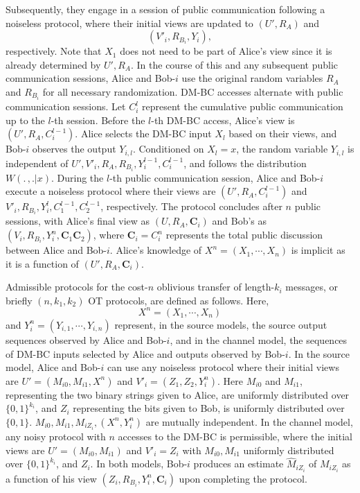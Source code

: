 \documentclass[runningheads]{llncs}
\newcommand{\parbreak}{ \vspace{0.3 em}}
\newcounter{protocol}
\begin{document}
\parbreak Subsequently, they engage in a session of public communication following a noiseless protocol, where their initial views are updated to $(U', R_{A})$ and \[(V'_i, R_{B_i}, Y_i),\] respectively. Note that $X_{1}$ does not need to be part of Alice's view since it is already determined by $U', R_{A}$. In the course of this and any subsequent public communication sessions, Alice and Bob-$i$ use the original random variables $R_{A}$ and $R_{B_i}$ for all necessary randomization. DM-BC accesses alternate with public communication sessions. Let $C_i^l$ represent the cumulative public communication up to the $l$-th session. Before the $l$-th DM-BC access, Alice's view is $(U', R_{A}, C_i^{l-1})$. Alice selects the DM-BC input $X_{l}$ based on their views, and Bob-$i$ observes the output $Y_{i,l}$. Conditioned on $X_{l} = x$, the random variable $Y_{i,l}$ is independent of $U', V'_i, R_{A}, R_{B_i}, Y_i^{l-1}, C_i^{l-1}$, and follows the distribution $W(.\,,.|x)$. During the $l$-th public communication session, Alice and Bob-$i$ execute a noiseless protocol where their views are $(U', R_{A}, C_i^{l-1})$ and $V'_i, R_{B_i}, Y_i^l, C_1^{l-1},C_2^{l-1}$, respectively. The protocol concludes after $n$ public sessions, with Alice's final view as $(U, R_{A},\mathbf{C}_i)$ and Bob's as $(V_i, R_{B_i}, Y_i^n, \mathbf{C}_1 \mathbf{C}_2)$, where $\mathbf{C}_i = C_i^n$ represents the total public discussion between Alice and Bob-$i$. Alice's knowledge of $X^n = (X_{1}, \cdots, X_{n})$ is implicit as it is a function of $(U', R_{A}, \mathbf{C}_i)$. 

\parbreak Admissible protocols for the cost-$n$ oblivious transfer of length-$k_i$ messages, or briefly $(n,k_1,k_2)$ OT protocols, are defined as follows. Here, \[X^n = (X_{1}, \cdots, X_{n})\] and $Y_i^n = (Y_{i,1}, \cdots, Y_{i,n})$ represent, in the source models, the source output sequences observed by Alice and Bob-$i$, and in the channel model, the sequences of DM-BC inputs selected by Alice and outputs observed by Bob-$i$. In the source model, Alice and Bob-$i$ can use any noiseless protocol where their initial views are $U' = (M_{i0}, M_{i1}, X^n)$ and $V'_i = (Z_1, Z_2, Y_i^n)$. Here $M_{i0}$ and $M_{i1}$, representing the two binary strings given to Alice, are uniformly distributed over $\{0,1\}^{k_i}$, and $Z_i$ representing the bits given to Bob, is uniformly distributed over $\{0,1\}$. $M_{i0}, M_{i1}, M_{iZ_i}, (X^n, Y_i^n)$ are mutually independent. In the channel model, any noisy protocol with $n$ accesses to the DM-BC is permissible, where the initial views are $U' = (M_{i0}, M_{i1})$ and $V'_i = Z_i$ with $M_{i0}, M_{i1}$ uniformly distributed over $\{0,1\}^{k_i}$, and $Z_i$. In both models, Bob-$i$ produces an estimate $\hat{M}_{iZ_i}$ of $M_{iZ_i}$ as a function of his view $(Z_i, R_{B_i}, Y_i^n, \mathbf{C}_i)$ upon completing the protocol.
\end{document}
